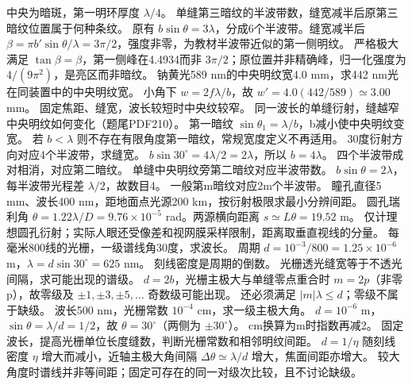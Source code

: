 \crosscheck 中央为暗斑，第一明环厚度 $\lambda/4$。
\problemtext 单缝第三暗纹的半波带数，缝宽减半后原第三暗纹位置属于何种条纹。
\workings 原有 $b\sin\theta=3\lambda$，分成6个半波带。缝宽减半后 $\beta=\pi b'\sin\theta/\lambda=3\pi/2$，强度非零，为教材半波带近似的第一侧明纹。
\crosscheck 严格极大满足 $\tan\beta=\beta$，第一侧峰在4.4934而非 $3\pi/2$；原位置并非精确峰，归一化强度为 $4/(9\pi^2)$，是亮区而非暗纹。
\problemtext 钠黄光589 nm的中央明纹宽4.0 mm，求442 nm光在同装置中的中央明纹宽。
\workings 小角下 $w=2f\lambda/b$，故 $w'=4.0(442/589)\simeq3.00$ mm。
\crosscheck 固定焦距、缝宽，波长较短时中央纹较窄。
\problemtext 同一波长的单缝衍射，缝越窄中央明纹如何变化（题尾PDF210）。
\workings 第一暗纹 $\sin\theta_1=\lambda/b$，b减小使中央明纹变宽。
\crosscheck 若 $b<\lambda$ 则不存在有限角度第一暗纹，常规宽度定义不再适用。
\problemtext 30度衍射方向对应4个半波带，求缝宽。
\workings $b\sin30^\circ=4\lambda/2=2\lambda$，所以 $b=4\lambda$。
\crosscheck 四个半波带成对相消，对应第二暗纹。
\problemtext 单缝中央明纹旁第二暗纹对应半波带数。
\workings $b\sin\theta=2\lambda$，每半波带光程差 $\lambda/2$，故数目4。
\crosscheck 一般第m暗纹对应2m个半波带。
\problemtext 瞳孔直径5 mm、波长400 nm，距地面点光源200 km，按衍射极限求最小分辨间距。
\workings 圆孔瑞利角 $\theta=1.22\lambda/D=9.76\times10^{-5}$ rad。两源横向距离 $s\simeq L\theta=19.52$ m。
\crosscheck 仅计理想圆孔衍射；实际人眼还受像差和视网膜采样限制，距离取垂直视线的分量。
\problemtext 每毫米800线的光栅，一级谱线角30度，求波长。
\workings 周期 $d=10^{-3}/800=1.25\times10^{-6}$ m，$\lambda=d\sin30^\circ=625$ nm。
\crosscheck 刻线密度是周期的倒数。
\problemtext 光栅透光缝宽等于不透光间隔，求可能出现的谱级。
\workings $d=2b$，光栅主极大与单缝零点重合时 $m=2p$（非零p），故零级及 $\pm1,\pm3,\pm5,\ldots$ 奇数级可能出现。
\crosscheck 还必须满足 $|m|\lambda\le d$；零级不属于缺级。
\problemtext 波长500 nm，光栅常数 $10^{-4}$ cm，求一级主极大角。
\workings $d=10^{-6}$ m，$\sin\theta=\lambda/d=1/2$，故 $\theta=30^\circ$（两侧为 $\pm30^\circ$）。
\crosscheck cm换算为m时指数再减2。
\problemtext 固定波长，提高光栅单位长度缝数，判断光栅常数和相邻明纹间距。
\workings $d=1/\eta$ 随刻线密度 $\eta$ 增大而减小，近轴主极大角间隔 $\Delta\theta\simeq\lambda/d$ 增大，焦面间距亦增大。
\crosscheck 较大角度时谱线并非等间距；固定可存在的同一对级次比较，且不讨论缺级。
